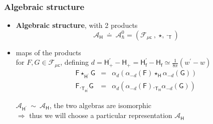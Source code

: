 \documentclass[9pt]{beamer}
\newcommand{\Tdot}{\cdot_\Tsf} %
\newcommand{\Acal}{\mathcal{A}}
\newcommand{\Fcal}{\mathcal{F}}
\newcommand{\Fsf}{\mathsf{F}}
\newcommand{\Gsf}{\mathsf{G}}
\newcommand{\Hsf}{\mathsf{H}}
\newcommand{\Tsf}{\mathsf{T}}
\newcommand{\csf}{\mathsf{c}}
\newcommand{\fsf}{\mathsf{f}}
\begin{document}
\begin{frame}

\frametitle{Algebraic structure}

\begin{itemize}
 
\item \textbf{Algebraic structure}, with 2 products
\vspace*{-2pt}
\begin{equation*}
\Acal_\Hsf \ \doteq \ \Acal^0_\hbar = \left( \Fcal_{\mu\csf} \ , \ \star , \Tdot \right)
\end{equation*}

\item maps of the products \\
for $F, G \in \Fcal_{\mu\csf}$, defining $d = \Hsf_+^\prime - \Hsf_+ = \Hsf_\fsf^\prime - \Hsf_\fsf \simeq \frac{1}{8\pi}\left( w^\prime - w \right)$
\vspace*{-4pt}
\begin{eqnarray*}
\Fsf \star_{\Hsf^\prime} \Gsf &=& \alpha_d \left( \alpha_{-d}(\Fsf) \star_\Hsf \alpha_{-d}(\Gsf) \right) \\ 
\Fsf ._{\Tsf_{\Hsf^\prime}} \Gsf &=& \alpha_d \left( \alpha_{-d}(\Fsf) ._{\Tsf_\Hsf} \alpha_{-d}(\Gsf) \right) 
\end{eqnarray*}

\vspace*{-9pt}

\begin{block}{}
\vspace*{-14pt}
\begin{center}
$\Acal_{\Hsf^\prime} \ \sim \ \Acal_{\Hsf}$, the two algebras are isomorphic \\
$\Rightarrow$ thus we will choose a particular representation $\Acal_{\Hsf}$
\end{center}
\vspace*{-5pt}
\end{block}

\end{itemize}
  
\end{frame}  

\end{document}
